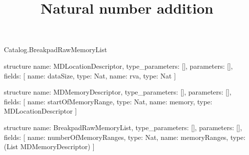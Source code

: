 \begin{lexlean}{Catalog.BreakpadRawMemoryList}
\title{Natural number addition}
\begin{semanticmodule}
structure{
  name: MDLocationDescriptor,
  type_parameters: [],
  parameters: [],
  fields: [
    {name: dataSize, type: Nat},
    {name: rva, type: Nat}
  ]
}

structure{
  name: MDMemoryDescriptor,
  type_parameters: [],
  parameters: [],
  fields: [
    {name: startOfMemoryRange, type: Nat},
    {name: memory, type: MDLocationDescriptor}
  ]
}

structure{
  name: BreakpadRawMemoryList,
  type_parameters: [],
  parameters: [],
  fields: [
    {name: numberOfMemoryRanges, type: Nat},
    {name: memoryRanges, type: (List MDMemoryDescriptor)}
  ]
}
\end{semanticmodule}
\end{lexlean}
